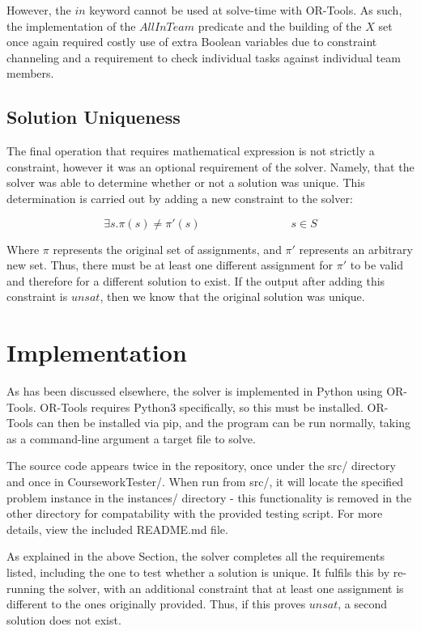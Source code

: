 \documentclass[11pt]{article}
\begin{document}
			However, the \(in\) keyword cannot be used at solve-time with OR-Tools.
			As such, the implementation of the \(AllInTeam\) predicate and the building of the \(X\) set
			once again required costly use of extra Boolean variables due to constraint channeling and
			a requirement to check individual tasks against individual team members.

		\subsection{Solution Uniqueness}

			The final operation that requires mathematical expression is not strictly a constraint,
			however it was an optional requirement of the solver.
			Namely, that the solver was able to determine whether or not a solution was unique.
			This determination is carried out by adding a new constraint to the solver:

			\begin{equation}
				\exists s. \pi(s) \neq \pi'(s) \qquad \qquad \qquad \qquad s \in S
			\end{equation}

			Where \(\pi\) represents the original set of assignments, and \(\pi'\) represents an arbitrary new set.
			Thus, there must be at least one different assignment for \(\pi'\) to be valid and therefore
			for a different solution to exist. If the output after adding this constraint is \(unsat\),
			then we know that the original solution was unique.

	\section{Implementation}

		As has been discussed elsewhere, the solver is implemented in Python using OR-Tools.
		OR-Tools requires Python3 specifically, so this must be installed.
		OR-Tools can then be installed via pip, and the program can be run normally,
		taking as a command-line argument a target file to solve.

		The source code appears twice in the repository,
		once under the src/ directory and once in CourseworkTester/.
		When run from src/, it will locate the specified problem instance in the instances/ directory -
		this functionality is removed in the other directory for compatability with the provided testing script.
		For more details, view the included README.md file.

		As explained in the above Section, the solver completes all the requirements listed, including the one to test whether a solution is unique.
		It fulfils this by re-running the solver, with an additional constraint that at least one assignment is different to the ones originally provided.
		Thus, if this proves \(unsat\), a second solution does not exist.
\end{document}
